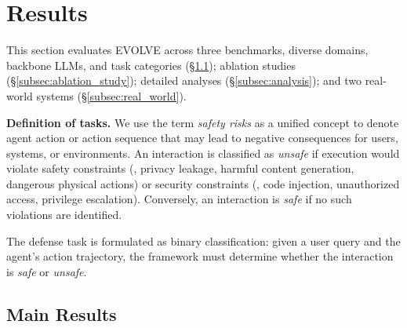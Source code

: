 \section{Results}
\label{sec:results} 
This section evaluates EVOLVE across three benchmarks, diverse domains, backbone LLMs, and task categories (\S\ref{subsec:benchmark_performance}); ablation studies (\S\ref{subsec:ablation_study}); detailed analyses (\S\ref{subsec:analysis}); and two real-world systems (\S\ref{subsec:real_world}).

\noindent\textbf{Definition of tasks.} We use the term \emph{safety risks} as a unified concept to denote agent action or action sequence that may lead to negative consequences for users, systems, or environments. An interaction is classified as \emph{unsafe} if execution would violate safety constraints (\eg, privacy leakage, harmful content generation, dangerous physical actions) or security constraints (\eg, code injection, unauthorized access, privilege escalation). Conversely, an interaction is \emph{safe} if no such violations are identified. 

The defense task is formulated as binary classification: given a user query and the agent's action trajectory, the framework must determine whether the interaction is \emph{safe} or \emph{unsafe}.

\subsection{Main Results}
\label{subsec:benchmark_performance}
% 

